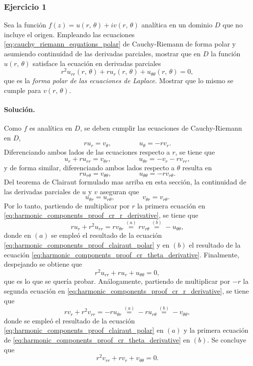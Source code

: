 \documentclass[a4paper]{report}
\begin{document}
\subsubsection{Ejercicio 1}

Sea la función \(f(z)=u(r,\,\theta)+iv(r,\,\theta)\) analítica en un dominio \(D\) que no incluye el origen. Empleando las ecuaciones \ref{eq:cauchy_riemann_equations_polar} de Cauchy-Riemann de forma polar y asumiendo continuidad de las derivadas parciales, mostrar que en \(D\) la función \(u(r,\,\theta)\) satisface la ecuación en derivadas parciales
\[
 r^2u_{rr}(r,\,\theta)+ru_r(r,\,\theta)+u_{\theta\theta}(r,\,\theta)=0,
\]
que es la \emph{forma polar de las ecuaciones de Laplace}. Mostrar que lo mismo se cumple para \(v(r,\,\theta)\).

\paragraph{Solución.} Como \(f\) es analítica en \(D\), se deben cumplir las ecuaciones de Cauchy-Riemann en \(D\),
\[
 ru_r=v_\theta, 
 \qquad\qquad
 u_\theta=-rv_r.
\]
Diferenciando ambos lados de las ecuaciones respecto a \(r\), se tiene que 
\begin{equation}\label{eq:harmonic_components_proof_cr_r_derivative}
 u_r+ru_{rr}=v_{\theta r},
 \qquad\qquad
 u_{\theta r}=-v_r-rv_{rr},
\end{equation}
y de forma similar, diferenciando ambos lados respecto a \(\theta\) resulta en
\begin{equation}\label{eq:harmonic_components_proof_cr_theta_derivative}
 ru_{r\theta}=v_{\theta\theta}, 
 \qquad\qquad
 u_{\theta\theta}=-rv_{r\theta}. 
\end{equation}
Del teorema de Clairaut formulado mas arriba en esta sección, la continuidad de las derivadas parciales de \(u\) y \(v\) aseguran que
\begin{equation}\label{eq:harmonic_components_proof_clairaut_polar}
 u_{\theta r}=u_{r\theta},
 \qquad\qquad
 v_{\theta r}=v_{r\theta}.
\end{equation}
Por lo tanto, partiendo de multiplicar por \(r\) la primera ecuación en \ref{eq:harmonic_components_proof_cr_r_derivative}, se tiene que 
\[
 ru_r+r^2u_{rr}=rv_{\theta r}\overset{(a)}{=}rv_{r\theta}\overset{(b)}{=}-u_{\theta\theta},
\]
donde en \((a)\) se empleó el resultado de la ecuación \ref{eq:harmonic_components_proof_clairaut_polar} y en \((b)\) el resultado de la ecuación \ref{eq:harmonic_components_proof_cr_theta_derivative}. Finalmente, despejando se obtiene que 
\[
 r^2u_{rr}+ru_r+u_{\theta\theta}=0,
\]
que es lo que se quería probar. Análogamente, partiendo de multiplicar por \(-r\) la segunda ecuación en \ref{eq:harmonic_components_proof_cr_r_derivative}, se tiene que 
\[
 rv_r+r^2v_{rr}=-ru_{\theta r}\overset{(a)}{=}-ru_{r\theta}\overset{(b)}{=}-v_{\theta\theta},
\]
donde se empleó el resultado de la ecuación \ref{eq:harmonic_components_proof_clairaut_polar} en \((a)\) y la primera ecuación de \ref{eq:harmonic_components_proof_cr_theta_derivative} en \((b)\). Se concluye que 
\[
 r^2v_{rr}+rv_r+v_{\theta\theta}=0.
\]
\end{document}
